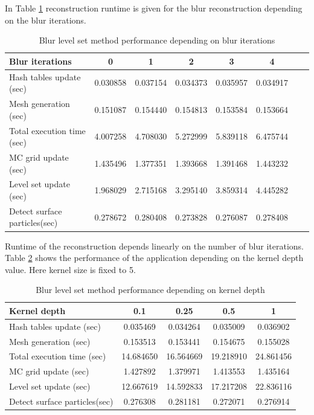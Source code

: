 In Table \ref{tab:bi_perf_analysis} reconstruction runtime is given for the blur reconstruction depending on the blur iterations. 
\begin{table}[H]
	\begin{center}
		\scriptsize
		\begin{tabular}{|l|c|c|c|c|c|c|c|}
			\hline
			Blur iterations & 0 & 1 & 2 & 3 & 4 \\
			\hline
			Hash tables update (sec)		&	0.030858	&	0.037154	&	0.034373	&	0.035957	&	0.034917\\
			Mesh generation	(sec)			&	0.151087	&	0.154440	&	0.154813	&	 0.153584	&	0.153664\\
			Total execution time (sec)		&	4.007258	&	4.708030	&	5.272999	&	5.839118	&	6.475744\\
			MC grid update (sec)			&	1.435496	&	1.377351	&	1.393668	&	1.391468	&	1.443232\\
			Level set update (sec)			&	1.968029	&	2.715168	&	3.295140	&	3.859314	&	4.445282\\
			Detect surface particles(sec)	&	0.278672	&	0.280408	&	0.273828	&	0.276087	&	0.278408\\
			\hline
		\end{tabular}
	\end{center}
	\caption{Blur level set method performance depending on blur iterations}
	\label{tab:bi_perf_analysis}
\end{table}
Runtime of the reconstruction depends linearly on the number of blur iterations.\\

Table \ref{tab:kd_perf_analysis} shows the performance of the application depending on the kernel depth value. Here kernel size is fixed to 5.
\begin{table}[H]
	\begin{center}
		\scriptsize
		\begin{tabular}{|l|c|c|c|c|}
			\hline
			Kernel depth & 0.1 & 0.25 & 0.5 & 1 \\
			\hline
			Hash tables update (sec)		&	0.035469	&	0.034264	&	0.035009	&	0.036902\\
			Mesh generation	(sec)			&	0.153513	&	0.153441	&	0.154675	&	 0.155028\\
			Total execution time (sec)		&	14.684650	&	16.564669	&	19.218910	&	24.861456\\
			MC grid update (sec)			&	1.427892	&	1.379971	&	1.413553	&	1.435164\\
			Level set update (sec)			&	12.667619	&	14.592833	&	17.217208	&	22.836116\\
			Detect surface particles(sec)	&	0.276308	&	0.281181	&	0.272071	&	0.276914\\
			\hline
		\end{tabular}
	\end{center}
	\caption{Blur level set method performance depending on kernel depth}
	\label{tab:kd_perf_analysis}
\end{table}

